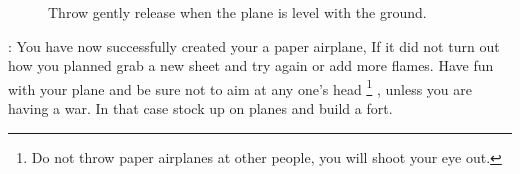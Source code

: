 \documentclass[12pt]{article}
\newcommand\head[1]{\noindent{\large\textbf{#1}}:\newline}
\begin{document}
\begin{figure}[!t]
  \centering
  \caption{Throw gently release when the plane is level with the ground.}
  \qquad
\end{figure}

\vspace{\baselineskip}

\head{Conclusion}
\indent You have now successfully created your a paper airplane, If it did not turn out how you planned grab a new sheet and try again or add more flames.
 Have fun with your plane and be sure not to aim at any one's head
 \footnote[2]{Do not throw paper airplanes at other people, you will shoot your eye out.}
 , unless you are having a war. In that case stock up on planes and build a fort. 
\end{document}

